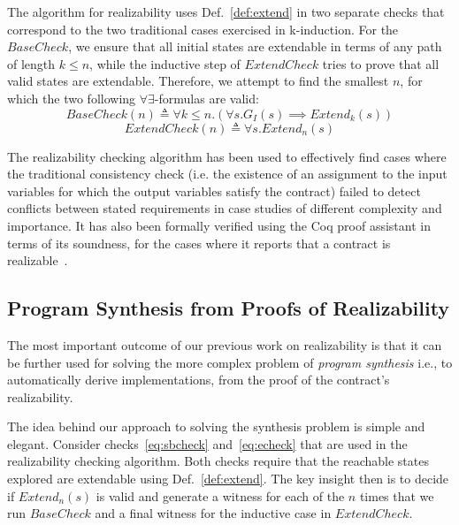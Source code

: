 The algorithm for realizability uses Def.~\ref{def:extend} in two
separate checks that correspond to the two traditional cases exercised in
k-induction. For the $\mathit{BaseCheck}$, we ensure that all initial states are
extendable in terms of any path of length $k\le n$, while the inductive step of
$\mathit{ExtendCheck}$ tries to prove that all valid states are extendable.
Therefore, we attempt to find the smallest $n$, for which the two following 
$\forall\exists$-formulas are valid:%
%
\begin{equation}
\label{eq:sbcheck}
\mathit{BaseCheck}(n) \triangleq \forall k \leq n. (\forall s. G_I(s)
	  	\implies \mathit{Extend}_k(s))
\end{equation}%
%
\begin{equation}
\label{eq:echeck}
\mathit{ExtendCheck}(n) \triangleq \forall s. \mathit{Extend}_n(s)
\end{equation}

The realizability checking algorithm has been used to effectively find cases
where the traditional consistency check (i.e. the existence of an assignment
to the input variables for which the output variables satisfy the contract)
failed to detect conflicts between stated requirements in case studies of
different complexity and importance. It has also been formally verified using the Coq proof assistant in terms of its
soundness, for the cases where it reports that a contract is
realizable~\cite{katis2015machine}.

\subsection{Program Synthesis from Proofs of Realizability}

The most important outcome of our previous work on realizability is that it 
 can be further used for solving the more complex problem of
\emph{program synthesis} i.e., to automatically
derive implementations, from the proof of the contract's
realizability.

The idea behind our approach to solving the synthesis problem is
simple and elegant. Consider checks~\eqref{eq:sbcheck} and~\eqref{eq:echeck} that
are used in the realizability checking algorithm. Both checks require
that the reachable states explored are extendable using
Def.~\ref{def:extend}.
The key insight then is to decide if $\mathit{Extend}_{n}(s)$ is valid and generate a witness 
for each of the $n$ times that we run $\mathit{BaseCheck}$ and a final witness 
for the inductive case in $\mathit{ExtendCheck}$.

